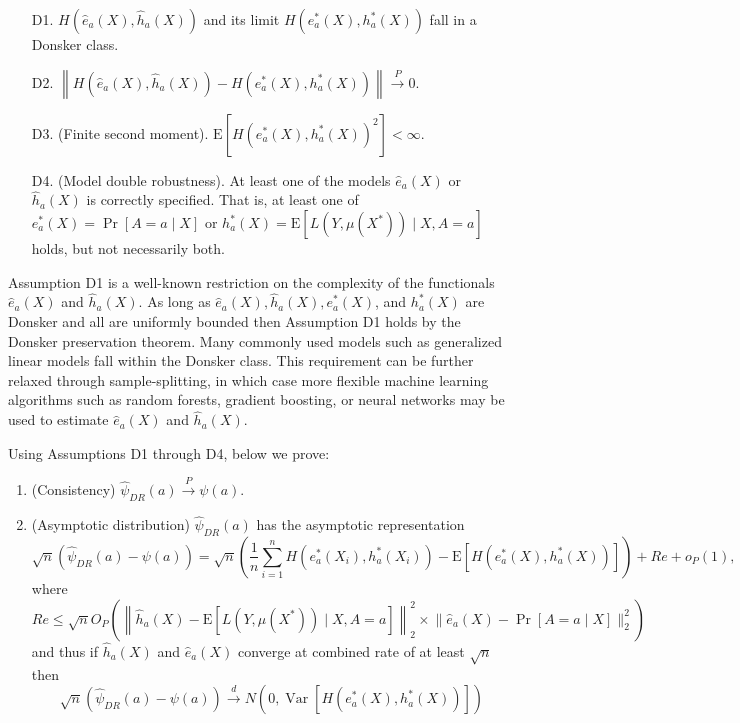 \begin{enumerate}
    \item[D1.] $H(\widehat{e}_a(X), \widehat{h}_a(X))$ and its limit $H\left(e^*_a(X), h^*_a(X)\right)$ fall in a Donsker class.
    \item[D2.]  $\left\|H(\widehat{e}_a(X), \widehat{h}_a(X))-H\left(e^*_a(X), h^*_a(X)\right)\right\| \stackrel{P}{\longrightarrow} 0$.
    \item[D3.] (Finite second moment). $\mathrm{E}\left[H\left(e^*_a(X), h^*_a(X)\right)^2\right]<\infty$.
    \item[D4.] (Model double robustness). At least one of the models $\widehat{e}_a(X)$ or $\widehat{h}_a(X)$ is correctly specified. That is, at least one of $e^*_a(X)=\operatorname{Pr}[A=a \mid X]$ or $h^*_a(X)=\mathrm{E}\left[L\left(Y, \mu\left(X^*\right)\right) \mid X, A=a\right]$ holds, but not necessarily both.
\end{enumerate}

Assumption D1 is a well-known restriction on the complexity of the functionals $\widehat{e}_a(X)$ and $\widehat{h}_a(X)$. As long as $\widehat{e}_a(X), \widehat{h}_a(X), e^*_a(X)$, and $h^*_a(X)$ are Donsker and all are uniformly bounded then Assumption D1 holds by the Donsker preservation theorem. Many commonly used models such as generalized linear models fall within the Donsker class. This requirement can be further relaxed through sample-splitting, in which case more flexible machine learning algorithms such as random forests, gradient boosting, or neural networks may be used to estimate $\widehat{e}_a(X)$ and $\widehat{h}_a(X)$. 

Using Assumptions D1 through D4, below we prove:
\begin{enumerate}
    \item (Consistency) $\widehat{\psi}_{DR}(a) \stackrel{P}{\longrightarrow} \psi(a)$.
    \item (Asymptotic distribution) $\widehat{\psi}_{DR}(a)$ has the asymptotic representation
    $$
    \sqrt{n}\left(\widehat{\psi}_{DR}(a)-\psi(a)\right)=\sqrt{n}\left(\frac{1}{n} \sum_{i=1}^n H\left(e^*_a(X_i), h^*_a(X_i)\right)-\mathrm{E}\left[H\left(e^*_a(X), h^*_a(X)\right)\right]\right)+R e+o_P(1),
    $$
    where
    $$
    R e \leq \sqrt{n} O_P\left(\left\|\widehat{h}_a(X)-\mathrm{E}\left[L\left(Y, \mu(X^*)\right) \mid X, A=a\right]\right\|_2^2 \times\Big\|\widehat{e}_a(X)-\operatorname{Pr}[A=a \mid X]\Big\|_2^2\right) 
    $$
    and thus if $\widehat{h}_a(X)$ and $\widehat{e}_a(X)$ converge at combined rate of at least $\sqrt{n}$ then
    $$
    \sqrt{n}\left(\widehat{\psi}_{DR}(a)-\psi(a)\right) \stackrel{d}{\longrightarrow} N\left(0, \operatorname{Var}\left[H(e^*_a(X), h^*_a(X))\right]\right)
    $$
\end{enumerate}


